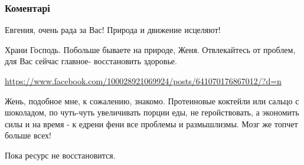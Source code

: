  
 
 
 
 
\subsubsection{Коментарі}

\begin{itemize}
 
Евгения, очень рада за Вас! Природа и движение исцеляют!

 
Храни Господь. Побольше бываете на природе, Женя. Отвлекайтесь от проблем, для Вас сейчас главное- восстановить здоровье.

 
\url{https://www.facebook.com/100028921069924/posts/641070176867012/?d=n}

 

Жень, подобное мне, к сожалению, знакомо. Протеиновые коктейли или сальцо с шоколадом,
по чуть-чуть увеличивать порции еды,
не геройствовать, а экономить силы
и на время - к едрени фени все проблемы и размышлизмы. Мозг же топчет больше всех!

Пока ресурс не восстановится.

\end{itemize}

